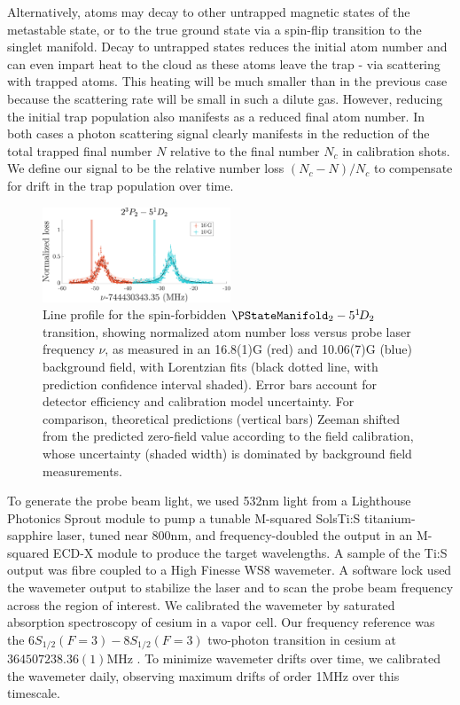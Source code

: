 Alternatively, atoms may decay to other untrapped magnetic states of the metastable state, or to the true ground state via a spin-flip transition to the singlet manifold.
	Decay to untrapped states reduces the initial atom number and can even impart heat to the cloud as these atoms leave the trap - via scattering with trapped atoms.
	This heating will be much smaller than in the previous case because the scattering rate will be small in such a dilute gas.
	However, reducing the initial trap population also manifests as a reduced final atom number.
	In both cases a photon scattering signal clearly manifests in the reduction of the total trapped final number $N$ relative to the final number $N_c$ in calibration shots.
	We define our signal to be the relative number loss $(N_c-N)/N_c$ to compensate for drift in the trap population over time.



\begin{figure}[t]
    \centering
    \includegraphics[width=0.5\textwidth]{fig/spectroscopy/ci-plot-51D2-eps-converted-to.pdf}
    \caption{Line profile for the spin-forbidden $\PStateManifold_2 -  5^{1\!}D_2$ transition, showing normalized atom number loss versus probe laser frequency $\nu$, as measured in an {16.8(1)}G (red) and {10.06(7)}G (blue) background field, with Lorentzian fits (black dotted line, with prediction confidence interval shaded).
	Error bars account for detector efficiency and calibration model uncertainty.
	For comparison, theoretical predictions (vertical bars) Zeeman shifted from the predicted zero-field value \cite{Drake07} according to the field calibration, whose uncertainty (shaded width) is dominated by background field measurements.}
    \label{fig:1D_2_line}
  \end{figure}


To generate the probe beam light, we used 532nm light from a Lighthouse Photonics Sprout module to pump a tunable M-squared SolsTi:S titanium-sapphire laser, tuned near 800nm, and frequency-doubled the output in an M-squared ECD-X module to produce the target wavelengths.
	A sample of the Ti:S output was fibre coupled to a High Finesse WS8 wavemeter.
	A software lock used the wavemeter output to stabilize the laser and to scan the probe beam frequency across the region of interest.
	We calibrated the wavemeter by saturated absorption spectroscopy of cesium in a vapor cell.
	Our frequency reference was the $6S_{1/2}(F=3)-8S_{1/2}(F=3)$ two-photon transition in cesium at $364507238.36(1)$MHz \cite{Wu13}.
	To minimize wavemeter drifts over time, we calibrated the wavemeter daily, observing maximum drifts of order 1MHz over this timescale.
	

